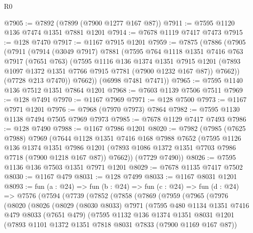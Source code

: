 \begin{lexlean}{R0}
\begin{coremodule}
@7905 := @7892 (@7899 (@7900 @1277 @167 @87))
@7911 := @7595 @1120 @136 @7474 @1351 @7881 @1201
@7914 := @7678 @1119 @7417 @7473
@7915 := @128 @7470
@7917 := @1167 @7915 @1201
@7959 := @7875
    (@7886
      (@7905
        (@7911
          (@7914
            (@3049 @7917)
            @7881
            (@7595
              @764
              @1118
              @1351
              @7416
              @763
              @7917
              (@7651 @763)
              (@7595
                @1116
                @136
                @1374
                @1351
                @7915
                @1201
                (@7893 @1097 @1372 @1351 @7766 @7915 @7781 (@7900 @1232 @167 @87))
                @7662))
            (@7728 @213 @7470))
          @7662))
      (@6998 @7481 @7471))
@7965 := @7595 @1140 @136 @7512 @1351 @7864 @1201
@7968 := @7603 @1139 @7506 @7511
@7969 := @128 @7491
@7970 := @1167 @7969
@7971 := @128 @7500
@7973 := @1167 @7971 @1201
@7976 := @7968 (@7970 @7973) @7864
@7982 := @7595 @1130 @1138 @7494 @7505 @7969 @7973
@7985 := @7678 @1129 @7417 @7493
@7986 := @128 @7490
@7988 := @1167 @7986 @1201
@8020 := @7982
    (@7985
      (@7625 @7988)
      @7969
      (@7644
        @1128
        @1351
        @7416
        @168
        @7988
        @7652
        (@7595
          @1126
          @136
          @1374
          @1351
          @7986
          @1201
          (@7893 @1086 @1372 @1351 @7703 @7986 @7718 (@7900 @1218 @167 @87))
          @7662))
      (@7729 @7490))
@8026 := @7595 @1136 @136 @7503 @1351 @7971 @1201
@8029 := @7678 @1135 @7417 @7502
@8030 := @1167 @479
@8031 := @128 @7499
@8033 := @1167 @8031 @1201
@8093 := fun (a : @24) =>
  fun (b : @24) =>
  fun (c : @24) =>
  fun (d : @24) =>
  @7576
    (@7594
      (@7739
        (@7852
          (@7858
            (@7869
              (@7959
                (@7965
                  (@7976
                    (@8020
                      (@8026
                        (@8029
                          (@8030 @8033)
                          @7971
                          (@7595
                            @480
                            @1134
                            @1351
                            @7416
                            @479
                            @8033
                            (@7651 @479)
                            (@7595
                              @1132
                              @136
                              @1374
                              @1351
                              @8031
                              @1201
                              (@7893 @1101 @1372 @1351 @7818 @8031 @7833 (@7900 @1169 @167 @87))

\end{coremodule}
\end{lexlean}
